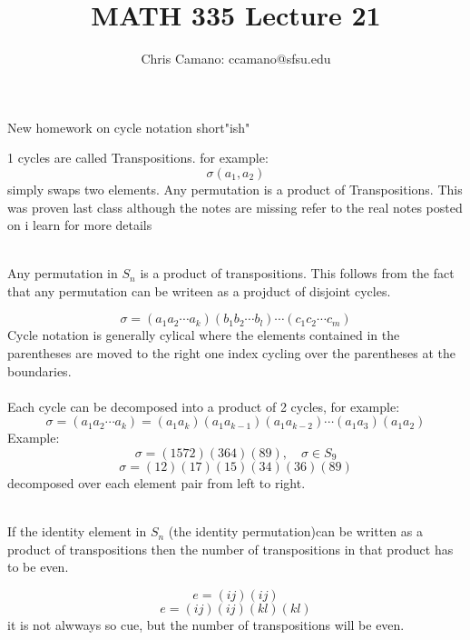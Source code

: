 \documentclass[11pt]{article}
\author{Chris Camano: ccamano@sfsu.edu}
\title{MATH 335  Lecture 21 }
\date
\theoremstyle{definition}  %
\newcommand{\block}[2]{\begin{tcolorbox}[title={#1}]{#2}\end{tcolorbox}}
\begin{document}
\maketitle
New homework on cycle notation short"ish"
\block{Transpositions}{
1 cycles are called Transpositions. for example:
\[
  \sigma(a_1,a_2)
\]
simply swaps two elements. Any permutation is a product of Transpositions. This was proven last class although the notes are missing refer to the real notes posted on i learn for more details\\\\
}
\block{Theorem}{
Any permutation in $S_n$ is a product of transpositions. This follows from the fact that any permutation can be writeen as a projduct of disjoint cycles.
}
\[
  \sigma=(a_1a_2\cdots a_k)(b_1b_2\cdots b_l)\cdots(c_1c_2\cdots c_m)
\]
Cycle notation is generally cylical where the elements contained in the parentheses are moved to the right one index cycling over the parentheses at the boundaries. \\\\
Each cycle can be decomposed into a product of 2 cycles, for example:
\\
\[
  \sigma=(a_1a_2\cdots a_k)=(a_1a_k)(a_1a_{k-1})(a_1a_{k-2})\cdots (a_1a_3)(a_1a_2)
\]
Example:
\[
  \sigma=(1572)(364)(89), \quad \sigma \in S_9
\]
\[
  \sigma=(12)(17)(15)(34)(36)(89)
\]
decomposed over each element pair from left to right. \\\\
\block{Lemma}{
If the identity element in $S_n$ (the identity permutation)can be written as a product of transpositions then the number of transpositions in that product has to be even.
}
\[
  e=(ij)(ij)
\]
\[
  e=(ij)(ij)(kl)(kl)
\]
it is not alwways so cue, but the number of transpositions will be even. \\
\end{document}
